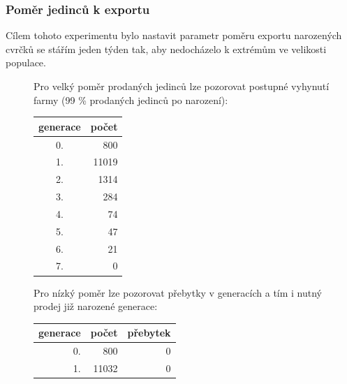 \documentclass[11pt, a4paper, titlepage]{article}
\begin{document}
    \subsubsection{Poměr jedinců k exportu}
    Cílem tohoto experimentu bylo nastavit parametr poměru exportu narozených cvrčků se stářím jeden týden tak, aby
    nedocházelo k extrémům ve velikosti populace.
    \begin{figure}[H]
        \centering
        \begin{minipage}{.48\textwidth}
            Pro velký poměr prodaných jedinců lze pozorovat postupné vyhynutí farmy (99 \% prodaných jedinců po narození):
            \begin{center}
                \begin{table}[H]
                    \begin{tabular}{|c|r|}
                        \hline
                        generace & počet \\
                        \hline
                        0. & 800  \\
                        1. & 11019  \\
                        2. & 1314  \\
                        3. & 284  \\
                        4. & 74  \\
                        5. & 47  \\
                        6. & 21  \\
                        7. & 0  \\
                        \hline
                    \end{tabular}
                \end{table}
            \end{center}
        \end{minipage}%
        \begin{minipage}{.5\textwidth}
            Pro nízký poměr lze pozorovat přebytky v generacích a tím i nutný prodej již narozené generace:
            \begin{center}
                \begin{table}[H]
                    \begin{tabular}{|r|r|r|}
                        \hline
                        generace & počet & přebytek \\
                        \hline
                        0. & 800 & 0 \\
                        1. & 11032 & 0 \\

\end{tabular}
\end{table}
\end{center}
\end{minipage}
\end{figure}
\end{document}
